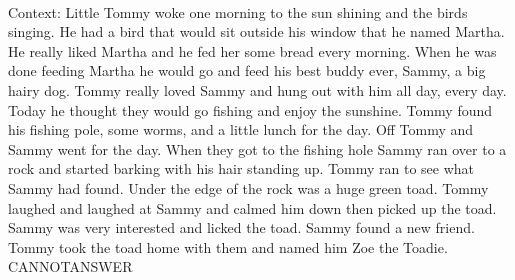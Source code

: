 \documentclass[11pt,a4paper, onecolumn]{article}
\begin{document}
\\ Context: Little Tommy woke one morning to the sun shining and the birds singing. He had a bird that would sit outside his window that he named Martha. He really liked Martha and he fed her some bread every morning. When he was done feeding Martha he would go and feed his best buddy ever, Sammy, a big hairy dog. Tommy really loved Sammy and hung out with him all day, every day. Today he thought they would go fishing and enjoy the sunshine. Tommy found his fishing pole, some worms, and a little lunch for the day. Off Tommy and Sammy went for the day. When they got to the fishing hole Sammy ran over to a rock and started barking with his hair standing up. Tommy ran to see what Sammy had found. Under the edge of the rock was a huge green toad. Tommy laughed and laughed at Sammy and calmed him down then picked up the toad. Sammy was very interested and licked the toad. Sammy found a new friend. Tommy took the toad home with them and named him Zoe the Toadie. CANNOTANSWER
\end{document}
